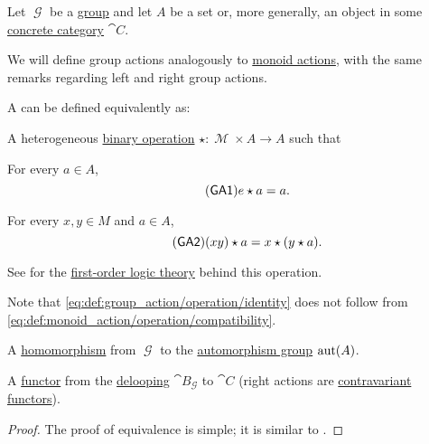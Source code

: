 \begin{definition}\label{def:group_action}
  Let \( \mscrG \) be a \hyperref[def:group]{group} and let \( A \) be a set or, more generally, an object in some \hyperref[def:concrete_category]{concrete category} \( \cat{C} \).

  We will define group actions analogously to \hyperref[def:monoid_action]{monoid actions}, with the same remarks regarding left and right group actions.

  A  can be defined equivalently as:
  \begin{thmenum}
     A heterogeneous \hyperref[def:magma]{binary operation} \( \star: \mscrM \times A \to A \) such that
    \begin{thmenum}
       For every \( a \in A \),
      \begin{equation}\label{eq:def:group_action/operation/identity}\tag{\logic{GA1}}
        e \star a = a.
      \end{equation}

       For every \( x, y \in M \) and \( a \in A \),
      \begin{equation}\label{eq:def:monoid_action/operation/compatibility}\tag{\logic{GA2}}
        (xy) \star a = x \star (y \star a).
      \end{equation}
    \end{thmenum}

    See  for the \hyperref[def:first_order_theory]{first-order logic theory} behind this operation.

    Note that \eqref{eq:def:group_action/operation/identity} does not follow from \eqref{eq:def:monoid_action/operation/compatibility}.

     A \hyperref[def:group/homomorphism]{homomorphism} from \( \mscrG \) to the \hyperref[def:automorphism_group]{automorphism group} \( \operatorname{aut}(A) \).

     A \hyperref[def:functor]{functor} from the \hyperref[def:monoid_delooping]{delooping} \( \cat{B}_\mscrG \) to \( \cat{C} \) (right actions are \hyperref[rem:contravariant_functor]{contravariant functors}).
  \end{thmenum}
\end{definition}
\begin{proof}
  The proof of equivalence is simple; it is similar to .
\end{proof}

